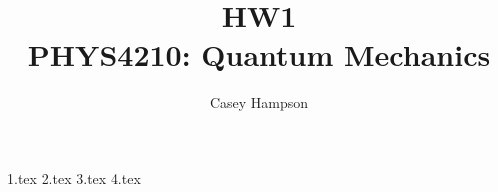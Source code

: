 \documentclass[titlepage]{article}
\title{HW1 \\[5pt] PHYS4210: Quantum Mechanics}
\author{Casey Hampson}
\begin{document}
    \maketitle
    \pagebreak

    {1.tex}
    {2.tex}
    {3.tex}
    {4.tex}
\end{document}
